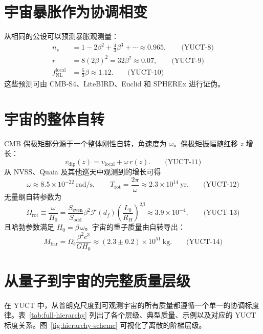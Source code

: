 \documentclass[12pt,a4paper]{article}
\newcommand{\betaf}{\beta}
\newcommand{\Sodd}{S_{\mathrm{odd}}}
\newcommand{\Seven}{S_{\mathrm{even}}}
\newcommand{\Mbar}{M_{\mathrm{bar}}}
\begin{document}
	\section{宇宙暴胀作为协调相变}
	
	从相同的公设可以预测暴胀观测量：
	\begin{align}
		n_s &= 1 - 2\betaf^2 + \frac{4}{3}\betaf^3 + \cdots \approx 0.965, \qquad\text{(YUCT-8)}\\
		r &= 8(2\betaf)^2 = 32\betaf^2 \approx 0.07, \qquad\text{(YUCT-9)}\\
		f_{\mathrm{NL}}^{\mathrm{local}} &= \frac{5}{3}\betaf \approx 1.12. \qquad\text{(YUCT-10)}
	\end{align}
	这些预测可由 CMB‑S4、LiteBIRD、Euclid 和 SPHEREx 进行证伪。
	
	\section{宇宙的整体自转}
	
	CMB 偶极矩部分源于一个整体刚性自转，角速度为 \(\omega\)。偶极矩振幅随红移 \(z\) 增长：
	\[
	v_{\mathrm{dip}}(z) = v_{\mathrm{local}} + \omega\, r(z). \qquad\text{(YUCT-11)}
	\]
	从 NVSS、Quaia 及其他巡天中观测到的增长可得
	\[
	\omega \approx 8.5\times 10^{-22}\ \mathrm{rad/s},\qquad
	T_{\mathrm{rot}} = \frac{2\pi}{\omega} \approx 2.3\times 10^{14}\ \mathrm{yr}. \qquad\text{(YUCT-12)}
	\]
	无量纲自转参数为
	\[
	\Omega_{\mathrm{rot}} \equiv \frac{\omega}{H_0} = \frac{\Seven}{\Sodd} \betaf^2 \mathcal{F}(d_f)\left(\frac{L_0}{R_H}\right)^{2\betaf} \approx 3.9\times 10^{-4}, \qquad\text{(YUCT-13)}
	\]
	且哈勃参数满足 \(H_0 = \betaf\,\omega\)。宇宙的重子质量由自转导出：
	\[
	\Mbar = \Omega_b\frac{\betaf^2 c^3}{G H_0} \approx (2.3\pm 0.2)\times 10^{51}\ \mathrm{kg}. \qquad\text{(YUCT-14)}
	\]
	
	\section{从量子到宇宙的完整质量层级}
	
	在 YUCT 中，从普朗克尺度到可观测宇宙的所有质量都遵循一个单一的协调标度律。表~\ref{tab:full-hierarchy} 列出了各个层级、典型质量、示例以及对应的 YUCT 标度关系。图~\ref{fig:hierarchy-scheme} 可视化了离散的阶梯层级。
	
\end{document}
